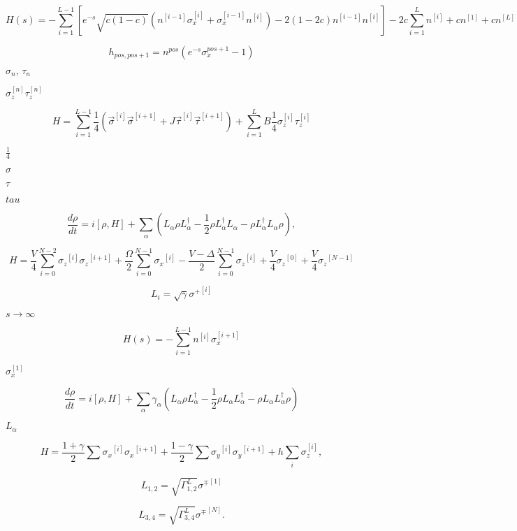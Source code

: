 \documentclass{article}
\begin{document}
{\[ H(s)=-\sum_{i=1}^{L-1} \left [ e^{-s} \sqrt{c(1-c)} \left ( n^{[i-1]} \sigma_x^{[i]} + \sigma_x^{[i-1]} n^{[i]}\right ) -2(1-2c) n^{[i-1]} n^{[i]} \right ] -2 c \sum_{i=1}^L n^{[i]}+c n^{[1]} +c n^{[L]} \]
\pagebreak

\[ h_{pos,pos+1}=n^{pos}(e^{-s} \sigma_x^{pos+1}-1) \]
\pagebreak

$\sigma_n,\, \tau_n$
\pagebreak

$\sigma_z^{[n]} \tau_z^{[n]}$
\pagebreak

\[ H=\sum_{i=1}^{L-1} \frac{1}{4}\left ( \vec{\sigma}^{[i]}\vec{\sigma}^{[i+1]} + J \vec{\tau}^{[i]}\vec{\tau}^{[i+1]} \right ) + \sum_{i=1}^{L} B \frac{1}{4} \sigma_z^{[i]}\tau_z^{[i]} \]
\pagebreak

$\frac{1}{4}$
\pagebreak

$\sigma$
\pagebreak

$\tau$
\pagebreak

$tau$
\pagebreak

\[ \frac{d\rho}{d t}=i[\rho,H]+\sum_{\alpha}\left( L_{\alpha} \rho L_{\alpha}^{\dagger}-\frac{1}{2} \rho L_{\alpha}^{\dagger} L_{\alpha} -\rho L_{\alpha}^{\dagger} L_{\alpha} \rho\right), \]
\pagebreak

\[ H=\frac{V}{4}\sum_{i=0}^{N-2} {\sigma_{z}}^{[i]}{\sigma_{z}}^{[i+1]} +\frac{\Omega}{2}\sum_{i=0}^{N-1} {\sigma_{x}}^{[i]}-\frac{V-\Delta}{2}\sum_{i=0}^{N-1} {\sigma_{z}}^{[i]} +\frac{V}{4}{\sigma_{z}}^{[0]}+\frac{V}{4}{\sigma_{z}}^{[N-1]} \]
\pagebreak

\[ L_{i}=\sqrt{\gamma}{\sigma^{+}}^{[i]} \]
\pagebreak

$s\to\infty$
\pagebreak

\[ H(s)=-\sum_{i=1}^{L-1} n^{[i]} \sigma_x^{[i+1]} \]
\pagebreak

$\sigma_x^{[1]}$
\pagebreak

\[ \frac{d\rho}{d t}=i[\rho,H]+\sum_{\alpha}\gamma_{\alpha}\left( L_{\alpha} \rho L_{\alpha}^{\dagger}-\frac{1}{2} \rho L_{\alpha} L_{\alpha}^{\dagger} -\rho L_{\alpha} L_{\alpha}^{\dagger} \rho\right) \]
\pagebreak

$L_{\alpha}$
\pagebreak

\[ H=\frac{1+\gamma}{2}\sum {\sigma_{x}}^{[i]}{\sigma_{x}}^{[i+1]} +\frac{1-\gamma}{2}\sum {\sigma_{y}}^{[i]}{\sigma_{y}}^{[i+1]} + h\sum_i \sigma_z^{[i]}, \]
\pagebreak

\[ L_{1,2}=\sqrt{\Gamma_{1,2}^{L}}{\sigma^{\mp}}^{[1]} \]
\pagebreak

\[ L_{3,4}=\sqrt{\Gamma_{3,4}^{L}}{\sigma^{\mp}}^{[N]}. \]
\pagebreak

}
\end{document}
